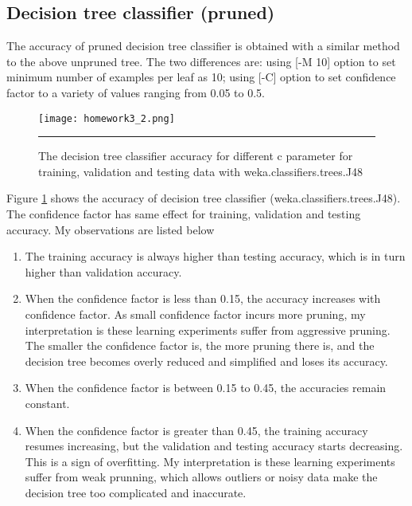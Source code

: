 \documentclass[12pt]{article}
\begin{document}
\subsection{Decision tree classifier (pruned)}
The accuracy of pruned decision tree classifier is obtained with a similar method to the above unpruned tree. The two differences are: using [-M 10] option to set minimum number of examples per leaf as 10; using [-C] option to set confidence factor to a variety of values ranging from 0.05 to 0.5.
\begin{figure}[htb]
  \centering
      {\texttt{[image: homework3\_2.png]}} \rule{1\linewidth}{1pt}
      \caption{The decision tree classifier accuracy for different c parameter for training, validation and testing data with weka.classifiers.trees.J48}
      \label{fig:accuracy_decision_tree}
\end{figure}
Figure \ref{fig:accuracy_decision_tree} shows the accuracy of decision tree classifier (weka.classifiers.trees.J48). The confidence factor has same effect for training, validation and testing accuracy. My observations are listed below
\begin{enumerate}
\item The training accuracy is always higher than testing accuracy, which is in turn higher than validation accuracy.
\item When the confidence factor is less than 0.15, the accuracy increases with confidence factor. As small confidence factor incurs more pruning, my interpretation is these learning experiments suffer from aggressive pruning. The smaller the confidence factor is, the more pruning there is, and the decision tree becomes overly reduced and simplified and loses its accuracy.
\item When the confidence factor is between 0.15 to 0.45, the accuracies remain constant.
\item When the confidence factor is greater than 0.45, the training accuracy resumes increasing, but the validation and testing accuracy starts decreasing. This is a sign of overfitting. My interpretation is these learning experiments suffer from weak prunning, which allows outliers or noisy data make the decision tree too complicated and inaccurate.
\end{enumerate}
\end{document}
